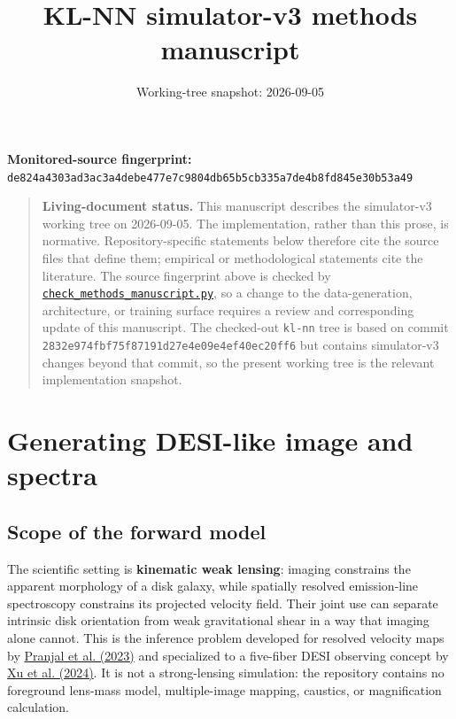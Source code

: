\documentclass[11pt]{article}
\title{KL-NN simulator-v3 methods manuscript}
\author{}
\date{Working-tree snapshot: 2026-09-05}
\newcommand{\code}[1]{\nolinkurl{#1}}
\begin{document}
\maketitle
\begin{center}
\small\textbf{Monitored-source fingerprint:} \code{de824a4303ad3ac3a4debe477e7c9804db65b5cb335a7de4b8fd845e30b53a49}
\end{center}


\begin{quote}
\small
\textbf{Living-document status.} This manuscript describes the simulator-v3
working tree on 2026-09-05. The implementation, rather than this prose, is
normative. Repository-specific statements below therefore cite the source
files that define them; empirical or methodological statements cite the
literature. The source fingerprint above is checked by
\href{check_methods_manuscript.py}{\code{check_methods_manuscript.py}}, so a change to
the data-generation, architecture, or training surface requires a review and
corresponding update of this manuscript. The checked-out \code{kl-nn} tree is
based on commit \code{2832e974fbf75f87191d27e4e09e4ef40ec20ff6} but contains
simulator-v3 changes beyond that commit, so the present working tree is the
relevant implementation snapshot.
\end{quote}

\section{Generating DESI-like image and spectra}

\subsection{Scope of the forward model}

The scientific setting is \textbf{kinematic weak lensing}: imaging constrains the
apparent morphology of a disk galaxy, while spatially resolved emission-line
spectroscopy constrains its projected velocity field. Their joint use can
separate intrinsic disk orientation from weak gravitational shear in a way
that imaging alone cannot. This is the inference problem developed for
resolved velocity maps by \hyperlink{ref:pranjal2023}{Pranjal et al. (2023)} and specialized
to a five-fiber DESI observing concept by \hyperlink{ref:xu2024}{Xu et al. (2024)}. It is not
a strong-lensing simulation: the repository contains no foreground lens-mass
model, multiple-image mapping, caustics, or magnification calculation.
\end{document}
